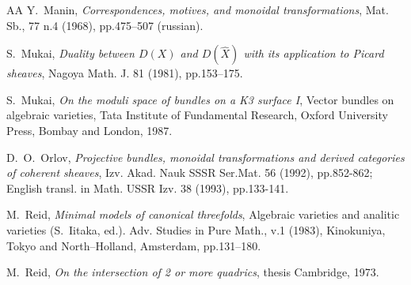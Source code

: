 \documentclass[12pt]{article}
\begin{document}
\begin{thebibliography}{AA}
 Y.~Manin, {\it Correspondences, motives, and monoidal transformations}, Mat. Sb., 77 n.4 (1968), pp.475--507 (russian).

 S.~Mukai, {\it Duality between $D(X)$ and $D(\hat X)$ with its application to Picard sheaves}, Nagoya Math. J. 81 (1981), pp.153--175.

 S.~Mukai, {\it On the moduli space of bundles on a K3 surface I},  Vector bundles on algebraic varieties, Tata Institute of Fundamental Research, Oxford University Press, Bombay and London, 1987.

 D.~O.~Orlov, {\it Projective bundles, monoidal transformations and derived categories of coherent sheaves}, Izv. Akad. Nauk SSSR Ser.Mat. 56 (1992), pp.852-862; English transl. in Math. USSR Izv. 38 (1993), pp.133-141.  

 M.~Reid, {\it Minimal models of canonical threefolds}, Algebraic varieties and analitic varieties (S.~Iitaka, ed.). Adv. Studies in Pure Math., v.1 (1983), Kinokuniya, Tokyo and North--Holland, Amsterdam, pp.131--180.

 M.~Reid, {\it On the intersection of 2 or more quadrics}, thesis Cambridge, 1973.

\end{thebibliography}
\end{document}
